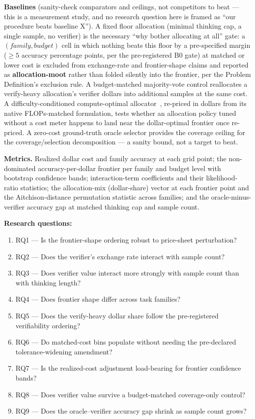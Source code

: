 \documentclass[11pt]{article}
\begin{document}
\textbf{Baselines} (sanity-check comparators and ceilings, not competitors to beat --- this is a measurement study, and no research question here is framed as ``our procedure beats baseline X''). A fixed floor allocation (minimal thinking cap, a single sample, no verifier) is the necessary ``why bother allocating at all'' gate: a $(family, budget)$ cell in which nothing beats this floor by a pre-specified margin ($\geq 5$ accuracy percentage points, per the pre-registered B0 gate) at matched or lower cost is excluded from exchange-rate and frontier-shape claims and reported as \textbf{allocation-moot} rather than folded silently into the frontier, per the Problem Definition's exclusion rule. A budget-matched majority-vote control reallocates a verify-heavy allocation's verifier dollars into additional samples at the same cost. A difficulty-conditioned compute-optimal allocator~\citep{SnellTTC4FWA}, re-priced in dollars from its native FLOPs-matched formulation, tests whether an allocation policy tuned without a cost meter happens to land near the dollar-optimal frontier once re-priced. A zero-cost ground-truth oracle selector provides the coverage ceiling for the coverage/selection decomposition --- a sanity bound, not a target to beat.

\textbf{Metrics.} Realized dollar cost and family accuracy at each grid point; the non-dominated accuracy-per-dollar frontier per family and budget level with bootstrap confidence bands; interaction-term coefficients and their likelihood-ratio statistics; the allocation-mix (dollar-share) vector at each frontier point and the Aitchison-distance permutation statistic across families; and the oracle-minus-verifier accuracy gap at matched thinking cap and sample count.

\textbf{Research questions:}
\begin{enumerate}[leftmargin=1.6em]
\item RQ1 --- Is the frontier-shape ordering robust to price-sheet perturbation?
\item RQ2 --- Does the verifier's exchange rate interact with sample count?
\item RQ3 --- Does verifier value interact more strongly with sample count than with thinking length?
\item RQ4 --- Does frontier shape differ across task families?
\item RQ5 --- Does the verify-heavy dollar share follow the pre-registered verifiability ordering?
\item RQ6 --- Do matched-cost bins populate without needing the pre-declared tolerance-widening amendment?
\item RQ7 --- Is the realized-cost adjustment load-bearing for frontier confidence bands?
\item RQ8 --- Does verifier value survive a budget-matched coverage-only control?
\item RQ9 --- Does the oracle--verifier accuracy gap shrink as sample count grows?
\end{enumerate}
\end{document}
